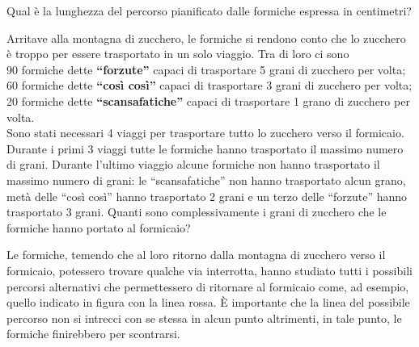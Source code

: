 \documentclass[12pt]{matemaj}
\begin{document}
\quesito[80;120]
Qual è la lunghezza del percorso pianificato dalle formiche espressa in centimetri?

\quesito[1950;2600]
Arritave alla montagna di zucchero, le formiche si rendono conto che lo zucchero è troppo per essere trasportato in un solo viaggio. Tra di loro ci sono\\
90 formiche dette {\bf ``forzute''} capaci di trasportare 5 grani di zucchero per volta;\\
60 formiche dette {\bf ``così così''} capaci di trasportare 3 grani di zucchero per volta;\\
20 formiche dette {\bf ``scansafatiche''} capaci di trasportare 1 grano di zucchero per volta.\\
Sono stati necessari 4 viaggi per trasportare tutto lo zucchero verso il formicaio. Durante i primi 3 viaggi tutte le formiche hanno trasportato il massimo numero di grani. Durante l'ultimo viaggio alcune formiche non hanno trasportato il massimo numero di grani: le ``scansafatiche'' non hanno trasportato alcun grano, metà delle ``così così'' hanno trasportato 2 grani e un terzo delle ``forzute'' hanno trasportato 3 grani. Quanti sono complessivamente i grani di zucchero che le formiche hanno portato al formicaio?

\begin{minipage}[c]{.75\textwidth}
Le formiche, temendo che al loro ritorno dalla montagna di zucchero verso il formicaio, potessero trovare qualche via interrotta, hanno studiato tutti i possibili percorsi alternativi che permettessero di ritornare al formicaio come, ad esempio, quello indicato in figura con la linea rossa. \`E importante che la linea del possibile percorso non si intrecci con se stessa in alcun punto altrimenti, in tale punto, le formiche finirebbero per scontrarsi.
\end{minipage}\hspace{.05\textwidth}
\begin{minipage}[c]{.20\textwidth}
\end{minipage}
\end{document}
